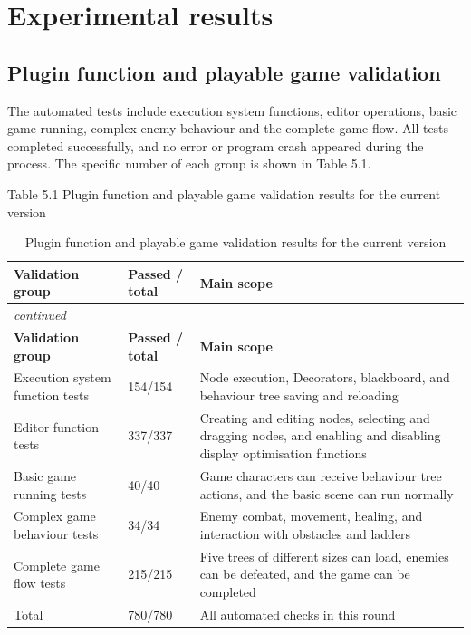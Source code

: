 \chapter{Experimental results}

\section{Plugin function and playable game validation}

The automated tests include execution system functions, editor operations, basic game running, complex enemy behaviour and the complete game flow. All tests completed successfully, and no error or program crash appeared during the process. The specific number of each group is shown in Table 5.1.

Table 5.1 Plugin function and playable game validation results for the current version

\begin{center}

\begin{longtable}{@{}p{} p{} p{}@{}}
\caption{Plugin function and playable game validation results for the current version}\label{tab:function-game-validation}\\
\toprule
\textbf{Validation group} & \textbf{Passed / total} & \textbf{Main scope} \\
\midrule
\endfirsthead
\multicolumn{3}{l}{\itshape continued}\\
\toprule
\textbf{Validation group} & \textbf{Passed / total} & \textbf{Main scope} \\
\midrule
\endhead
Execution system function tests & 154/154 & Node execution, Decorators, blackboard, and behaviour tree saving and reloading \\
Editor function tests & 337/337 & Creating and editing nodes, selecting and dragging nodes, and enabling and disabling display optimisation functions \\
Basic game running tests & 40/40 & Game characters can receive behaviour tree actions, and the basic scene can run normally \\
Complex game behaviour tests & 34/34 & Enemy combat, movement, healing, and interaction with obstacles and ladders \\
Complete game flow tests & 215/215 & Five trees of different sizes can load, enemies can be defeated, and the game can be completed \\
Total & 780/780 & All automated checks in this round \\
\bottomrule
\end{longtable}
\end{center}

